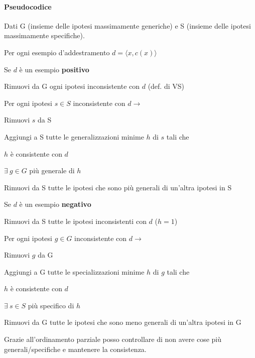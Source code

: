 \documentclass[10pt]{book}
\begin{document}
\paragraph{Pseudocodice} Dati G (insieme delle ipotesi massimamente generiche) e S (insieme delle ipotesi massimamente specifiche).
\begin{list}{}{}
	\item Per ogni esempio d'addestramento $d=\langle x, c(x)\rangle$
	\begin{list}{}{}
		\item Se $d$ è un esempio \textbf{positivo}
		\begin{list}{}{}
			\item Rimuovi da G ogni ipotesi inconsistente con $d$ (def. di VS)
			\item Per ogni ipotesi $s \in S$ inconsistente con $d \rightarrow$
			\begin{list}{}{\textbf{Generalizza S}}
				\item Rimuovi $s$ da S
				\item Aggiungi a S tutte le generalizzazioni minime $h$ di $s$ tali che
				\begin{list}{-}{}
					\item $h$ è consistente con $d$
					\item $\exists\:g \in G$ più generale di $h$
				\end{list}
				\item Rimuovi da S tutte le ipotesi che sono più generali di un'altra ipotesi in S
			\end{list}
		\end{list}
		\item Se $d$ è un esempio \textbf{negativo}
		\begin{list}{}{}
			\item Rimuovi da S tutte le ipotesi inconsistenti con $d$ ($h = 1$)
			\item Per ogni ipotesi $g \in G$ inconsistente con $d \rightarrow$
			\begin{list}{}{\textbf{Specializza G}}
				\item Rimuovi $g$ da G
				\item Aggiungi a G tutte le specializzazioni minime $h$ di $g$ tali che
				\begin{list}{-}{}
					\item $h$ è consistente con $d$
					\item $\exists\:s \in S$ più specifico di $h$
				\end{list}
				\item Rimuovi da G tutte le ipotesi che sono meno generali di un'altra ipotesi in G
			\end{list}
		\end{list}
	\end{list}
\end{list}
Grazie all'ordinamento parziale posso controllare di non avere cose più generali/specifiche e mantenere la consistenza.
\end{document}
